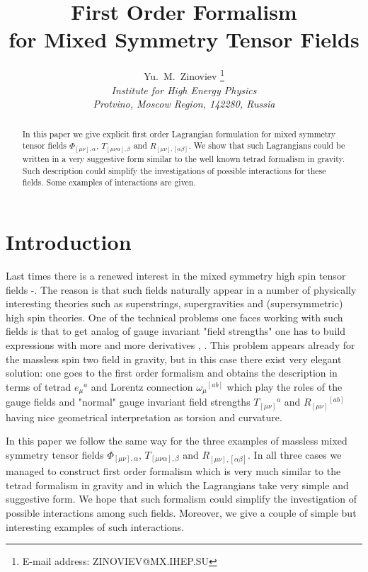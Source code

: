 \documentclass[a4paper,12pt]{article}
\author{Yu.~M.~Zinoviev
       \thanks{E-mail address: ZINOVIEV@MX.IHEP.SU} \\
        {\it Institute for High Energy Physics} \\
        {\it Protvino, Moscow Region, 142280, Russia}}
\title{First Order Formalism \\
       for Mixed Symmetry Tensor Fields }
\date{}
\begin{document}
\maketitle

\begin{abstract}
In this paper we give explicit first order Lagrangian formulation for
mixed symmetry tensor fields $\Phi_{[\mu\nu],\alpha}$,
$T_{[\mu\nu\alpha],\beta}$ and $R_{[\mu\nu],[\alpha\beta]}$. We show
that such Lagrangians could be written in a very suggestive form
similar to the well known tetrad formalism in gravity. Such
description could simplify the investigations of possible interactions
for these fields. Some examples of interactions are given.
\end{abstract}

\newpage
\setcounter{page}{1}

\section*{Introduction}

Last times there is a renewed interest in the mixed symmetry high spin
tensor fields \cite{Cur86}-\cite{Zin02}. The reason is that such
fields naturally appear in a number of physically interesting theories
such as superstrings, supergravities and (supersymmetric) high spin
theories. One of the technical problems one faces working with such
fields is that to get analog of gauge invariant "field strengths" one
has to build expressions with more and more derivatives \cite{BB02},
\cite{MH02}. This problem appears already for the massless spin two
field in gravity, but in this case there exist very elegant solution:
one goes to the first order formalism and obtains the description in
terms of tetrad $e_\mu{}^a$ and Lorentz connection
$\omega_\mu{}^{[ab]}$ which play the roles of the gauge fields and
"normal" gauge invariant field strengths $T_{[\mu\nu]}{}^a$ and
$R_{[\mu\nu]}{}^{[ab]}$ having nice geometrical interpretation as
torsion and curvature.

In this paper we follow the same way for the three examples of
massless mixed symmetry tensor fields $\Phi_{[\mu\nu],\alpha}$,
$T_{[\mu\nu\alpha],\beta}$ and $R_{[\mu\nu],[\alpha\beta]}$. In all
three cases we managed to construct first order formalism which is
very much similar to the tetrad formalism in gravity and in which the
Lagrangians take very simple and suggestive form. We hope that such
formalism could simplify the investigation of possible interactions
among such fields. Moreover, we give a couple of simple but
interesting examples of such interactions.
\end{document}
